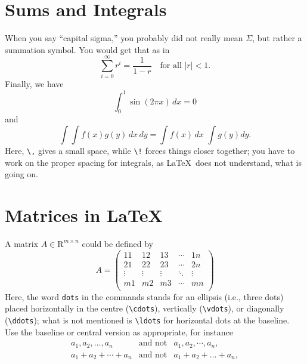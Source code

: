 \section{Sums and Integrals}
When you say ``capital sigma,'' you probably did not really mean $\Sigma$,
but rather a summation symbol. You would get that as in\premathpar
\begin{displaymath}
  \sum_{i=0}^{\infty} r^i = \frac{1}{1 - r} \quad \mbox{for all $|r| < 1$}.
\end{displaymath}
Finally, we have\premathpar
\begin{displaymath}
  \int_0^1 \sin(2 \pi x) \, dx = 0
\end{displaymath}
and\premathpar
\begin{displaymath}
  \int\!\!\int f(x) g(y) \, dx \, dy = \int f(x) \, dx \,\, \int g(y) dy.
\end{displaymath}
Here, \verb+\,+ gives a small space, while \verb+\!+ forces things closer
together; you have to work on the proper spacing for integrals, as \LaTeX\
does not understand, what is going on.
\clearpage %
\section{Matrices in \LaTeX}
A matrix $A \in \mathrm{R}^{m \times n}$ could be defined by\premathpar
\begin{displaymath}
  A = \left( \begin{array}{ccccc}
        11     & 12     & 13     & \cdots & 1n     \\
        21     & 22     & 23     & \cdots & 2n     \\
        \vdots & \vdots & \vdots & \ddots & \vdots \\
        m1     & m2     & m3     & \cdots & mn     \\
      \end{array} \right)
\end{displaymath}
Here, the word \verb+dots+ in the commands stands for an ellipsis
(i.e., three dots) placed horizontally in the centre (\verb+\cdots+),
vertically (\verb+\vdots+), or diagonally (\verb+\ddots+); what is
not mentioned is \verb+\ldots+ for horizontal dots at the baseline.
Use the baseline or central version as appropriate, for instance\premathpar
\begin{eqnarray*}
  a_1, a_2, \ldots, a_n & \mbox{and not} & a_1, a_2, \cdots, a_n, \\
  a_1 + a_2 + \cdots + a_n & \mbox{and not} & a_1 + a_2 + \ldots + a_n, \\
\end{eqnarray*}

